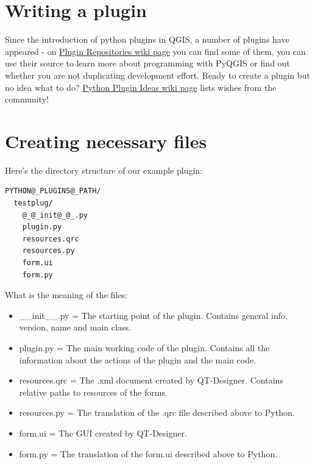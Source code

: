 \documentclass[letterpaper,10pt,english]{manual}
\begin{document}
\section{Writing a plugin}

Since the introduction of python plugins in QGIS, a number of plugins have appeared -
on \href{http://www.qgis.org/wiki/Python\_Plugin\_Repositories}{Plugin Repositories wiki page} you can find some of them,
you can use their source to learn more about programming with PyQGIS or find out whether you are not duplicating development effort.
Ready to create a plugin but no idea what to do? \href{http://www.qgis.org/wiki/Python\_Plugin\_Ideas}{Python Plugin Ideas wiki page} lists wishes from the community!


\section{Creating necessary files}

Here's the directory structure of our example plugin:

\begin{Verbatim}[commandchars=@\[\]]
PYTHON@_PLUGINS@_PATH/
  testplug/
    @_@_init@_@_.py
    plugin.py
    resources.qrc
    resources.py
    form.ui
    form.py
\end{Verbatim}

What is the meaning of the files:
\begin{itemize}
\item {} 
\_\_init\_\_.py = The starting point of the plugin. Contains general info, version, name and main class.

\item {} 
plugin.py = The main working code of the plugin. Contains all the information about the actions of the plugin and the main code.

\item {} 
resources.qrc = The .xml document created by QT-Designer. Contains relative paths to resources of the forms.

\item {} 
resources.py = The translation of the .qrc file described above to Python.

\item {} 
form.ui = The GUI created by QT-Designer.

\item {} 
form.py = The translation of the form.ui described above to Python.

\end{itemize}
\end{document}

